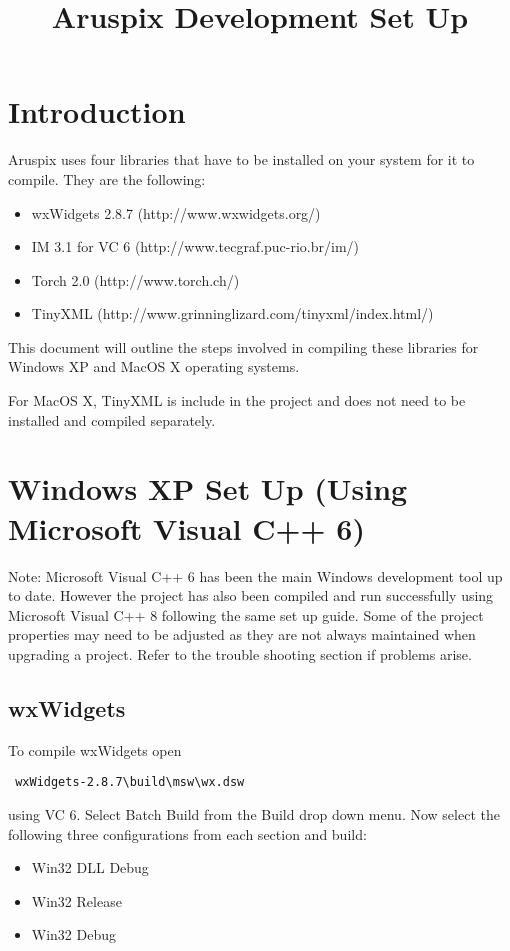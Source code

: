 \documentclass[]{article}
\title{Aruspix Development Set Up}
\author{  }
\begin{document}
\ifpdf
{}
\else
{}
\fi

\maketitle

\section{Introduction} 
Aruspix uses four libraries that have to be installed on your system for it to compile. 
They are the following:
\begin{itemize}
	\item wxWidgets 2.8.7 (http://www.wxwidgets.org/)
	\item IM 3.1 for VC 6 (http://www.tecgraf.puc-rio.br/im/) 
	\item Torch 2.0 (http://www.torch.ch/)
	\item TinyXML (http://www.grinninglizard.com/tinyxml/index.html/)
\end{itemize}
This document will outline the steps involved in compiling these libraries 
for Windows XP and MacOS X operating systems.

For MacOS X, TinyXML is include in the project and does not need to be installed and compiled separately.

\section{Windows XP Set Up (Using Microsoft Visual C++ 6)}
Note: Microsoft Visual C++ 6 has been the main Windows development tool up to 
date. However the project has also been compiled and run successfully using
Microsoft Visual C++ 8 following the same set up guide. Some of the project
properties may need to be adjusted as they are not always maintained when
upgrading a project. Refer to the trouble shooting section if problems arise.
\subsection{wxWidgets}
To compile wxWidgets open \begin{verbatim} wxWidgets-2.8.7\build\msw\wx.dsw \end{verbatim}
using VC 6. Select Batch Build from the Build drop down menu. Now select the
following three configurations from each section and build:
\begin{itemize}
    \item Win32 DLL Debug
    \item Win32 Release
    \item Win32 Debug
\end{itemize}	
\end{document}
